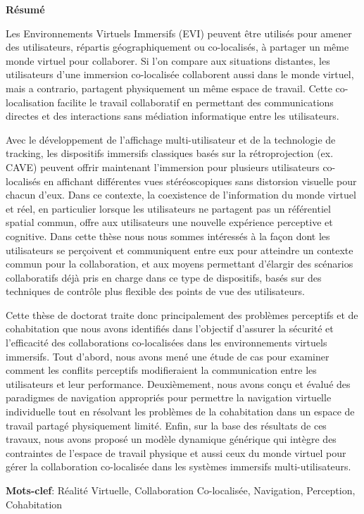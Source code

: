 \centerline{\LARGE \textbf{Résumé}}

\vspace*{\baselineskip}
Les Environnements Virtuels Immersifs (EVI) peuvent être utilisés pour amener des utilisateurs, répartis géographiquement ou co-localisés, à partager un même monde virtuel pour collaborer. Si l’on compare aux situations distantes, les utilisateurs d’une immersion co-localisée collaborent aussi  dans le monde virtuel, mais a contrario, partagent physiquement un même espace de travail. Cette co-localisation facilite le travail collaboratif en permettant des communications directes et des interactions sans médiation informatique entre les utilisateurs.

Avec le développement de l'affichage multi-utilisateur et de la technologie de tracking, les dispositifs immersifs classiques basés sur la rétroprojection (ex. CAVE) peuvent offrir maintenant l'immersion pour plusieurs utilisateurs co-localisés en affichant différentes vues stéréoscopiques sans distorsion visuelle pour chacun d’eux. Dans ce contexte, la coexistence de l'information du monde virtuel et réel, en particulier lorsque les utilisateurs ne partagent pas un référentiel spatial commun, offre aux utilisateurs une nouvelle expérience perceptive et cognitive. Dans cette thèse nous nous sommes intéressés à la façon dont les utilisateurs se perçoivent et communiquent entre eux pour atteindre un contexte commun pour la collaboration, et aux moyens permettant d’élargir des scénarios collaboratifs déjà pris en charge dans ce type de dispositifs, basés sur des techniques de contrôle plus flexible des points de vue des utilisateurs.
 
Cette thèse de doctorat traite donc principalement des problèmes perceptifs et de cohabitation que nous avons identifiés dans l’objectif d’assurer la sécurité et l’efficacité des colla\-borations co-localisées dans les environnements virtuels immersifs. Tout d'abord, nous avons mené une étude de cas pour examiner comment les conflits perceptifs modifieraient la communication entre les utilisateurs et leur performance. Deuxièmement, nous avons conçu et évalué des paradigmes de navigation appropriés pour permettre la navigation virtuelle individuelle tout en résolvant les problèmes de la cohabitation dans un espace de travail partagé physiquement limité. Enfin, sur la base des résultats de ces travaux, nous avons proposé un modèle dynamique générique qui intègre des contraintes de l'espace de travail physique et aussi ceux du monde virtuel pour gérer la collaboration co-localisée dans les systèmes immersifs multi-utilisateurs.


\textbf{Mots-clef}: Réalité Virtuelle, Collaboration Co-localisée, Navigation, Perception, Cohabitation